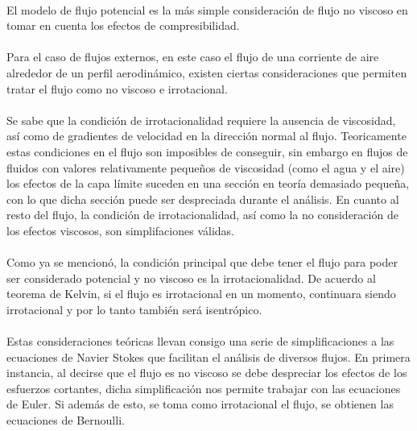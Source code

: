 \documentclass[letterpaper, openright, 12pt]{book}
\begin{document}
    \paragraph*{}
        El modelo de flujo potencial es la más simple consideración de flujo no viscoso en
        tomar en cuenta los efectos de compresibilidad.

    \paragraph*{}
        Para el caso de flujos externos, en este caso el flujo de una corriente
        de aire alrededor de un perfil aerodinámico, existen ciertas
        consideraciones que permiten tratar el flujo como no viscoso e
        irrotacional.

    \paragraph*{}
        Se sabe que la condición de irrotacionalidad requiere la ausencia de
        viscosidad, así como de gradientes de velocidad en la dirección normal
        al flujo. Teoricamente estas condiciones en el flujo son imposibles de
        conseguir, sin embargo en flujos de fluidos con valores relativamente
        pequeños de viscosidad (como el agua y el aire) los efectos de la capa
        límite suceden en una sección en teoría demasiado pequeña, con lo  que
        dicha sección puede ser despreciada durante el análisis. En cuanto al
        resto del flujo, la condición de irrotacionalidad, así como la no
        consideración de los efectos viscosos, son simplifaciones válidas.

    \paragraph*{}
        Como ya se mencionó, la condición principal que debe tener el flujo
        para poder ser considerado potencial y no viscoso es la
        irrotacionalidad. De acuerdo al teorema de Kelvin, si el flujo es
        irrotacional en un momento, continuara siendo irrotacional y por lo
        tanto también será isentrópico.

    \paragraph*{}
        Estas consideraciones teóricas llevan consigo una serie de
        simplificaciones a las ecuaciones de Navier Stokes que facilitan el
        análisis de diversos flujos. En primera instancia, al decirse que el
        flujo es no viscoso se debe despreciar los efectos de los esfuerzos
        cortantes, dicha simplificación nos permite trabajar con las ecuaciones
        de Euler. Si además de esto, se toma como irrotacional el flujo, se
        obtienen las ecuaciones de Bernoulli.
\end{document}
